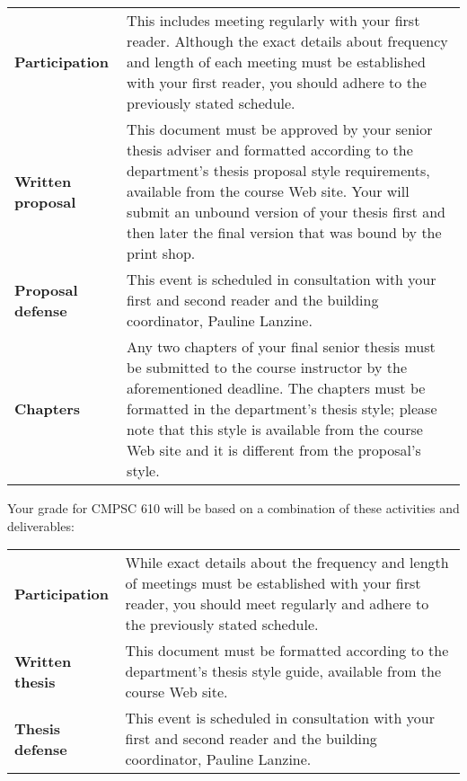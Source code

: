 % 

\vspace*{-.05in}
\begin{center}
\begin{tabular}{lp{4in}}

\bf Participation & This includes meeting regularly with your first reader. Although the exact details about frequency and
length of each meeting must be established with your first reader, you should adhere to the previously stated schedule.
\\[.1in]

\bf Written proposal & This document must be approved by your senior thesis adviser and formatted according to the 
department's thesis proposal style requirements, available from the course Web site. Your will submit an unbound version
of your thesis first and then later the final version that was bound by the print shop. \\[.1in]

\bf Proposal defense & This event is scheduled in consultation with your first and second reader and the building
coordinator, Pauline Lanzine. \\[.1in]

\bf Chapters & Any two chapters of your final senior thesis must be submitted to the course instructor by the
aforementioned deadline.  The chapters must be formatted in the department's thesis style; please note that
this style is available from the course Web site and it is different from the proposal's style.

\end{tabular}
\end{center}

\noindent
Your grade for CMPSC 610 will be based on a combination of these activities and deliverables:
\begin{center}
\begin{tabular}{lp{4in}}
\bf Participation & While exact details about the frequency and length of meetings must be established with your first
reader, you should meet regularly and adhere to the previously stated schedule. \\[.1in]

\bf Written thesis & This document must be formatted according to the department's thesis style guide, available from
the course Web site. \\[.1in]

\bf Thesis defense & This event is scheduled in consultation with your first and second reader and the building
coordinator, Pauline Lanzine. \\[.1in]

% 
\end{tabular}
\end{center}

